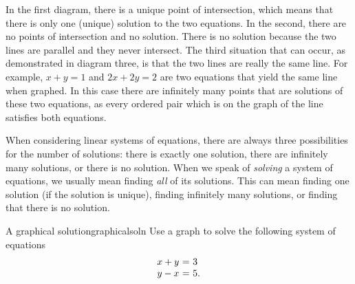 In the first diagram, there is a unique point of
intersection, which means that there is only one (unique) solution to the two equations. 
In the second, there are no points of intersection and  no solution. There is no solution because the two lines are parallel and they never intersect.
The third situation that can occur, as demonstrated in diagram three, is that the two lines are really the same line. For
example, $x+y=1$ and $2x+2y=2$ are two equations that yield the
same line when graphed. In this case there are infinitely many points that are
solutions of these two equations, as every ordered pair which is on the graph of
the line satisfies both equations. 

When considering linear systems of equations, there are always three
possibilities for the number of solutions: there is exactly one
solution, there are infinitely many solutions, or there is no
solution.  When we speak of {\em solving} a system of equations, we
usually mean finding {\em all} of its solutions. This can mean finding
one solution (if the solution is unique), finding infinitely many
solutions, or finding that there is no solution.

\begin{example}{A graphical solution}{graphicalsoln}
Use a graph to solve the following system of equations \:
\begin{equation*}
\begin{array}{r@{~}c@{~}l}
x+y&=&3 \\
y-x&=&5.
\end{array}
\end{equation*}
\end{example} 

